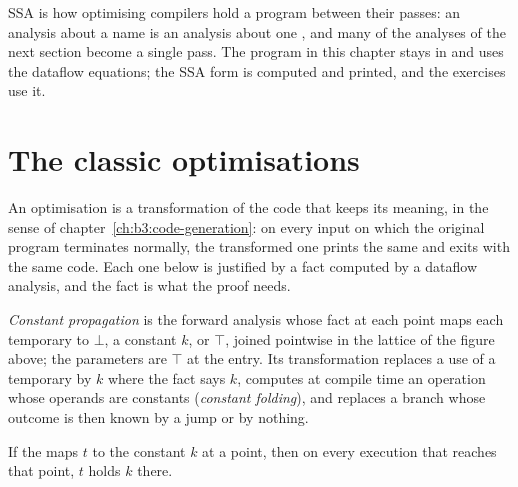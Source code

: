 SSA is how optimising compilers hold a program between their passes: an analysis about a name is an analysis about one , and many of the analyses of the next section become a single pass. The program in this chapter stays in  and uses the dataflow equations; the SSA form is computed and printed, and the exercises use it.

\section{The classic optimisations}\label{sec:b3:program-optimisation:optimisations}

An optimisation is a transformation of the code that keeps its meaning, in the sense of chapter~\ref{ch:b3:code-generation}: on every input on which the original program terminates normally, the transformed one prints the same and exits with the same code. Each one below is justified by a fact computed by a dataflow analysis, and the fact is what the proof needs.

\begin{definition}\label{def:b3:program-optimisation:constprop}
\emph{Constant propagation} is the forward analysis whose fact at each point maps each temporary to $\bot$, a constant $k$, or $\top$, joined pointwise in the lattice of the figure above; the parameters are $\top$ at the entry. Its transformation replaces a use of a temporary by $k$ where the fact says $k$, computes at compile time an operation whose operands are constants (\emph{constant folding}), and replaces a branch whose outcome is then known by a jump or by nothing.
\end{definition}

\label{lst:b3:program-optimisation:lattice}

\label{lst:b3:program-optimisation:constprop}

\begin{theorem}\label{thm:b3:program-optimisation:cpsound}
If the  maps $t$ to the constant $k$ at a point, then on every execution that reaches that point, $t$ holds $k$ there.
\end{theorem}

